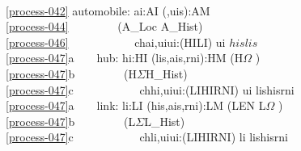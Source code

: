 {{%
\bp
{}\\
\ref{process-042} automobile: ai:AI {\RIGHTARROW} ({\UNDERLINE},uis):AM {\RIGHTARROW} {\DOTDOTDOT} {\RIGHTARROW} {\DOTDOTDOT} \\
\ref{process-044}\ \ \ \ \ \ \ \ {\RIGHTARROW} (A\_Loc {\TIMES} A\_Hist)\\
\ref{process-046}\ \ \ \ \ \ \ \ \ \ \  {\LBRACE}ch{\LBRACKET}{\LBRACE}ai,ui{\RBRACE}{\RBRACKET}{\BAR}ui:(HI{\BAR}LI) {\RDOT} ui {\ISIN} $his${\UNION}$lis${\RBRACE} \\
\ref{process-047}a\ \ \ \ hub: hi:HI {\RIGHTARROW} (lis,ais,rni):HM {\RIGHTARROW} (H$\Omega$ {\TIMES} {\DOTDOTDOT}) {\RIGHTARROW} {\DOTDOTDOT} \\
\ref{process-047}b\ \ \ \ \ \ \ \ {\RIGHTARROW} (H$\Sigma${\TIMES}H\_Hist)\\
\ref{process-047}c\ \ \ \ \ \ \ \ \ \ \  {\LBRACE}ch{\LBRACKET}{\LBRACE}hi,ui{\RBRACE}{\RBRACKET}{\BAR}ui:(LI{\BAR}HI{\BAR}RNI) {\RDOT} ui {\ISIN} lis{\UNION}his{\UNION}rni{\RBRACE}  \\
\ref{process-047}a\ \ \ \ link: li:LI {\RIGHTARROW} (his,ais,rni):LM {\RIGHTARROW} (LEN {\TIMES} L$\Omega$ {\TIMES} {\DOTDOTDOT})\\
\ref{process-047}b\ \ \ \ \ \ \ \ {\RIGHTARROW} (L$\Sigma${\TIMES}L\_Hist)\\
\ref{process-047}c\ \ \ \ \ \ \ \ \ \ \  {\LBRACE}ch{\LBRACKET}{\LBRACE}li,ui{\RBRACE}{\RBRACKET}{\BAR}ui:(LI{\BAR}HI{\BAR}RNI) {\RDOT} li {\ISIN} lis{\UNION}his{\UNION}rni{\RBRACE} 
\ep
}%
}%

\label{before:Behaviour Invocation}

\pos{}{\label{Behaviour Call}}

